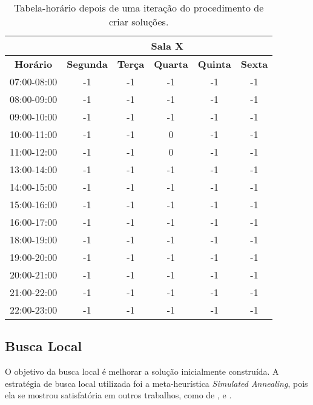 \begin{table}[!htbp]
\centering
\begin{tabular}{|c|c|c|c|c|c|}
\hline
\textbf{} & \multicolumn{5}{c|}{\textbf{Sala X}} \\ \hline
\textbf{Horário} & \textbf{Segunda} & \textbf{Terça} & \textbf{Quarta} & \textbf{Quinta} & \textbf{Sexta} \\ \hline
07:00-08:00 & -1  & -1  & -1  & -1  & -1  \\ \hline
08:00-09:00 & -1  & -1  & -1  & -1  & -1  \\ \hline
09:00-10:00 & -1  & -1  & -1  & -1  & -1  \\ \hline
10:00-11:00 & -1  & -1  &  \cellcolor[HTML]{FFCE93}0  & -1  & -1  \\ \hline
11:00-12:00 & -1  & -1  &  \cellcolor[HTML]{FFCE93}0  & -1  & -1  \\ \hline
13:00-14:00 & -1  & -1  & -1  & -1  & -1  \\ \hline
14:00-15:00 & -1  & -1  & -1  & -1  & -1  \\ \hline
15:00-16:00 & -1  & -1  & -1  & -1  & -1  \\ \hline
16:00-17:00 & -1  & -1  & -1  & -1  & -1  \\ \hline
18:00-19:00 & -1  & -1  & -1  & -1  & -1  \\ \hline
19:00-20:00 & -1  & -1  & -1  & -1  & -1  \\ \hline
20:00-21:00 & -1  & -1  & -1  & -1  & -1  \\ \hline
21:00-22:00 & -1  & -1  & -1  & -1  & -1  \\ \hline
22:00-23:00 & -1  & -1  & -1  & -1  & -1  \\ \hline
\end{tabular}
\caption{Tabela-horário depois de uma iteração do procedimento de criar soluções.}
\label{tbl-met-gerad-soluc}
\end{table}


\subsection{Busca Local}
\label{sec-met-busca}

O objetivo da busca local é melhorar a solução inicialmente construída. A estratégia de busca local utilizada foi a meta-heurística \textit{Simulated Annealing}, pois ela se mostrou satisfatória em outros trabalhos, como de ,  e . 

